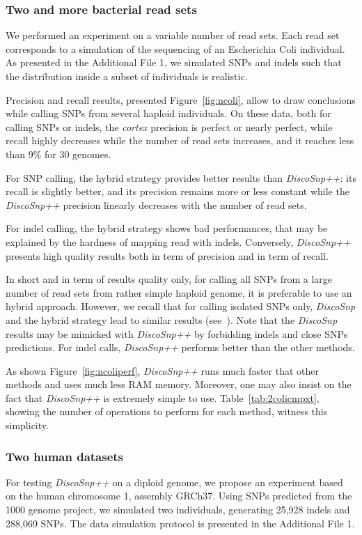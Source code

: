 \documentclass{bmcart}
\newcommand{\disco}{{\it DiscoSnp}\xspace}
\newcommand{\discopp}{{\it DiscoSnp++}\xspace}
\newcommand{\co}{{\it cortex}\xspace}
\begin{document}
\subsubsection*{Two and more bacterial read sets}
We performed an experiment on a variable number of read sets. Each read set corresponds to a simulation of the sequencing of an Escherichia Coli individual. As presented in the Additional File 1, we simulated SNPs and indels such that the distribution inside a subset of individuals is realistic. 

Precision and recall results, presented Figure~\ref{fig:ncoli}, allow to draw conclusions while calling SNPs from several haploid individuals. On these data, both for calling SNPs or indels, the \co precision is perfect or nearly perfect, while recall highly decreases while the number of read sets increases, and it reaches less than 9\% for 30 genomes. 

For SNP calling, the hybrid strategy provides better results than \discopp: its recall is slightly better, and its precision remains more or less constant while the \discopp precision linearly decreases with the number of read sets. 


For indel calling, the hybrid strategy shows bad performances, that may be explained by the hardness of mapping read with indels. Conversely, \discopp presents high quality results both in term of precision and in term of recall. 


In short and in term of results quality only, for calling all SNPs from a large number of read sets from rather simple haploid genome, it is preferable to use an hybrid approach. However, we recall that for calling isolated SNPs only, \disco and the hybrid strategy lead to similar results (see~\cite{Uricaru2014a}). Note that the \disco results may be mimicked with \discopp by forbidding indels and close SNPs predictions. For indel calls, \discopp performs better than the other methods.

As shown Figure~\ref{fig:ncoliperf}, \discopp runs much faster that other methods and uses much less RAM memory. Moreover, one may also insist on the fact that \discopp is extremely simple to use. Table~\ref{tab:2colicmpxt}, showing the number of operations to perform for each method, witness this simplicity.

\subsubsection*{Two human datasets}
\label{ssec:twohumans}
For testing \discopp on a diploid genome, we propose an experiment based on the human chromosome 1, assembly GRCh37. Using SNPs predicted from the 1000 genome project, we simulated two individuals, generating 25,928 indels and 288,069 SNPs. The data simulation protocol is presented in the Additional File 1. 
\end{document}
